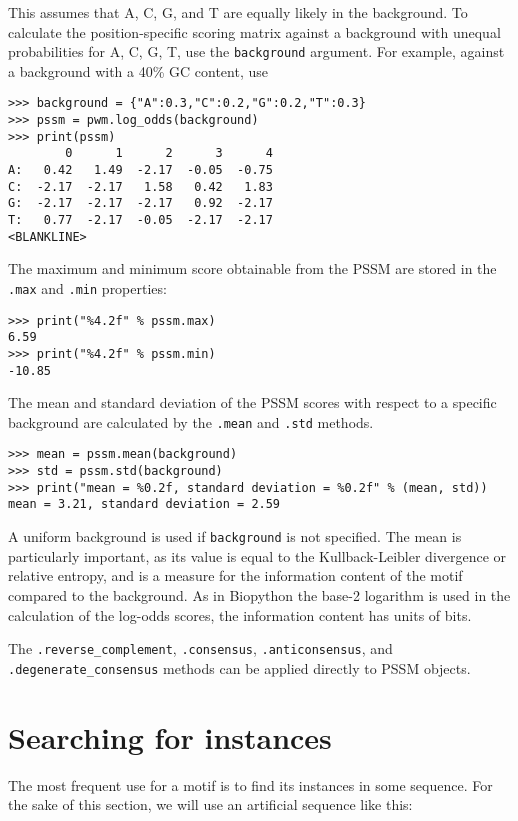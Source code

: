 This assumes that A, C, G, and T are equally likely in the background. To
calculate the position-specific scoring matrix against a background with
unequal probabilities for A, C, G, T, use the \verb+background+ argument.
For example, against a background with a 40\% GC content, use

\begin{verbatim}
>>> background = {"A":0.3,"C":0.2,"G":0.2,"T":0.3}
>>> pssm = pwm.log_odds(background)
>>> print(pssm)
        0      1      2      3      4
A:   0.42   1.49  -2.17  -0.05  -0.75
C:  -2.17  -2.17   1.58   0.42   1.83
G:  -2.17  -2.17  -2.17   0.92  -2.17
T:   0.77  -2.17  -0.05  -2.17  -2.17
<BLANKLINE>
\end{verbatim}

The maximum and minimum score obtainable from the PSSM are stored in the
\verb+.max+ and \verb+.min+ properties:

\begin{verbatim}
>>> print("%4.2f" % pssm.max)
6.59
>>> print("%4.2f" % pssm.min)
-10.85
\end{verbatim}

The mean and standard deviation of the PSSM scores with respect to a specific
background are calculated by the \verb+.mean+ and \verb+.std+ methods.

\begin{verbatim}
>>> mean = pssm.mean(background)
>>> std = pssm.std(background)
>>> print("mean = %0.2f, standard deviation = %0.2f" % (mean, std))
mean = 3.21, standard deviation = 2.59
\end{verbatim}
A uniform background is used if \verb+background+ is not specified.
The mean is particularly important, as its value is equal to the
Kullback-Leibler divergence or relative entropy, and is a measure for the
information content of the motif compared to the background. As in Biopython
the base-2 logarithm is used in the calculation of the log-odds scores, the
information content has units of bits.

The \verb+.reverse_complement+, \verb+.consensus+, \verb+.anticonsensus+, and
\verb+.degenerate_consensus+ methods can be applied directly to PSSM objects.

\section{Searching for instances}
\label{sec:search}

The most frequent use for a motif is to find its instances in some
sequence. For the sake of this section, we will use an artificial sequence like this:

